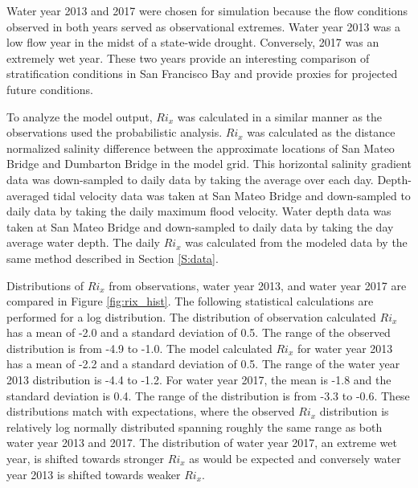 \documentclass[preprint,review,12pt]{elsarticle}
\begin{document}
Water year 2013 and 2017 were chosen for simulation because the flow conditions observed in both years served as observational extremes. Water year 2013 was a low flow year in the midst of a state-wide drought. Conversely, 2017 was an extremely wet year. These two years provide an interesting comparison of stratification conditions in San Francisco Bay and provide proxies for projected future conditions.  

To analyze the model output, \(Ri_x\) was calculated in a similar manner as the observations used the probabilistic analysis. \(Ri_x\) was calculated as the distance normalized salinity difference between the approximate locations of San Mateo Bridge and Dumbarton Bridge in the model grid. This horizontal salinity gradient data was down-sampled to daily data by taking the average over each day. Depth-averaged tidal velocity data was taken at San Mateo Bridge and down-sampled to daily data by taking the daily maximum flood velocity. Water depth data was taken at San Mateo Bridge and down-sampled to daily data by taking the day average water depth. The daily \(Ri_x\) was calculated from the modeled data by the same method described in Section \ref{S:data}.

Distributions of \(Ri_x\) from observations, water year 2013, and water year 2017 are compared in Figure \ref{fig:rix_hist}. The following statistical calculations are performed for a log distribution. The distribution of observation calculated \(Ri_x\) has a mean of -2.0 and a standard deviation of 0.5. The range of the observed distribution is from -4.9 to -1.0. The model calculated \(Ri_x\) for water year 2013 has a mean of -2.2 and a standard deviation of 0.5. The range of the water year 2013 distribution is -4.4 to -1.2. For water year 2017, the mean is -1.8 and the standard deviation is 0.4. The range of the distribution is from -3.3 to -0.6. These distributions match with expectations, where the observed \(Ri_x\) distribution is relatively log normally distributed spanning roughly the same range as both water year 2013 and 2017. The distribution of water year 2017, an extreme wet year, is shifted towards stronger \(Ri_x\) as would be expected and conversely water year 2013 is shifted towards weaker \(Ri_x\). 
\end{document}
